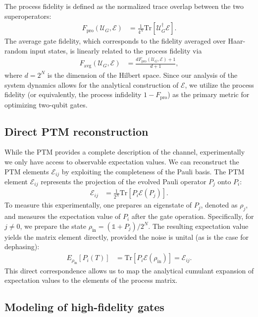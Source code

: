 \documentclass[%
 reprint,
superscriptaddress,
 amsmath,amssymb,
 aps,
pra,
floatfix,
]{revtex4-2}
\begin{document}
The process fidelity is defined as the normalized trace overlap between the two superoperators:
\begin{align}
    F_{\text{pro}}(\mathcal{U}_G, \mathcal{E}) &= \frac{1}{4^N} \text{Tr}\left[\mathcal{U}_G^\dagger \mathcal{E}\right].
\end{align}
The average gate fidelity, which corresponds to the fidelity averaged over Haar-random input states, is linearly related to the process fidelity via
\begin{align}
    F_{\text{avg}}(\mathcal{U}_G, \mathcal{E}) &= \frac{d F_{\text{pro}}(\mathcal{U}_G, \mathcal{E}) + 1}{d + 1},
\end{align}
where $d=2^N$ is the dimension of the Hilbert space. Since our analysis of the system dynamics allows for the analytical construction of $\mathcal{E}$, we utilize the process fidelity (or equivalently, the process infidelity $1-F_{\text{pro}}$) as the primary metric for optimizing two-qubit gates.

\subsection{Direct PTM reconstruction}
While the PTM provides a complete description of the channel, experimentally we only have access to observable expectation values. We can reconstruct the PTM elements $\mathcal{E}_{ij}$ by exploiting the completeness of the Pauli basis. The PTM element $\mathcal{E}_{ij}$ represents the projection of the evolved Pauli operator $P_j$ onto $P_i$:
\begin{align}
    \mathcal{E}_{ij} &= \frac{1}{2^N} \text{Tr}\left[P_i \mathcal{E}(P_j)\right].
\end{align}
To measure this experimentally, one prepares an eigenstate of $P_j$, denoted as $\rho_j$, and measures the expectation value of $P_i$ after the gate operation. Specifically, for $j \neq 0$, we prepare the state $\rho_{\text{in}} = (\mathbb{1} + P_j)/2^N$. The resulting expectation value yields the matrix element directly, provided the noise is unital (as is the case for dephasing):
\begin{align}
    E_{\rho_{\text{in}}}[P_i(T)] &= \text{Tr}[P_i \mathcal{E}(\rho_{\text{in}})] = \mathcal{E}_{ij}.
\end{align}
This direct correspondence allows us to map the analytical cumulant expansion of expectation values to the elements of the process matrix.

\subsection{Modeling of high-fidelity gates}
\label{sec::highFid}
\end{document}
